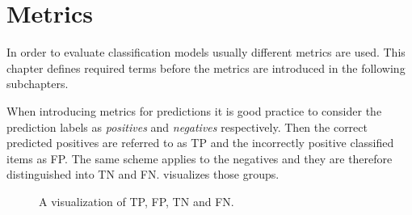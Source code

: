 \section{Metrics}
\label{chp:fundamentals:sec:metrics}

In order to evaluate classification models usually different metrics are used.
This chapter defines required terms before the metrics are introduced in the following subchapters.

When introducing metrics for predictions it is good practice to consider the prediction labels as \textit{positives} and \textit{negatives} respectively.
Then the correct predicted positives are referred to as \ac{TP} and the incorrectly positive classified items as \ac{FP}.
The same scheme applies to the negatives and they are therefore distinguished into \ac{TN} and \ac{FN}.
 visualizes those groups. \parencite{Powers:2011}

\begin{figure}[htpb]
    \centering
    \def\svgwidth{\columnwidth}
    
    \caption[Visualization of True Positives]{A visualization of \ac{TP}, \ac{FP}, \ac{TN} and \ac{FN}.}\label{fig:metrics:tp_vis}
\end{figure}






